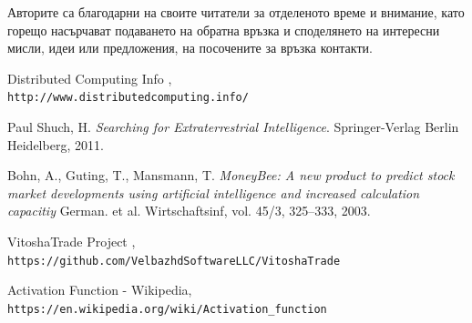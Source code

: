 \documentclass[book,14pt,oneside,openany]{memoir}
\begin{document}
Авторите са благодарни на своите читатели за отделеното време и внимание, като горещо насърчават подаването на обратна връзка и споделянето на интересни мисли, идеи или предложения, на посочените за връзка контакти.

\newpage
\begin{thebibliography}{99}

 Distributed Computing Info , \\\texttt{http://www.distributedcomputing.info/}

 Paul Shuch, H. \textit{Searching for Extraterrestrial Intelligence}. Springer-Verlag Berlin Heidelberg, 2011.

 Bohn, A., Guting, T., Mansmann, T. \textit{MoneyBee: A new product to predict stock market developments using artificial intelligence and increased calculation capacitiy} German. et al. Wirtschaftsinf, vol. 45/3, 325--333, 2003.

 VitoshaTrade Project , \\\texttt{https://github.com/VelbazhdSoftwareLLC/VitoshaTrade}

 Activation Function - Wikipedia, \\\texttt{https://en.wikipedia.org/wiki/Activation\_function}

\end{thebibliography}

\newpage
\listoffigures


\newpage
\printindex
\end{document}
